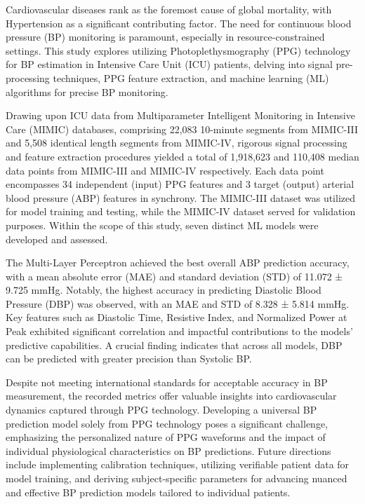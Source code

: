     Cardiovascular diseases rank as the foremost cause of global mortality, with Hypertension as a significant contributing factor.
    The need for continuous blood pressure (BP) monitoring is paramount, especially in resource-constrained settings.
    This study explores utilizing Photoplethysmography (PPG) technology for BP estimation in Intensive Care Unit (ICU) patients, delving into signal pre-processing techniques,
    PPG feature extraction, and machine learning (ML) algorithms for precise BP monitoring.

    \vspace{0.4cm}

    Drawing upon ICU data from Multiparameter Intelligent Monitoring in Intensive Care (MIMIC) databases, comprising 22,083 10-minute segments from MIMIC-III and 5,508 identical length segments from MIMIC-IV,
    rigorous signal processing and feature extraction procedures yielded a total of 1,918,623 and 110,408 median data points from MIMIC-III and MIMIC-IV respectively.
    Each data point encompasses 34 independent (input) PPG features and 3 target (output) arterial blood pressure (ABP) features in synchrony.
    The MIMIC-III dataset was utilized for model training and testing, while the MIMIC-IV dataset served for validation purposes.
    Within the scope of this study, seven distinct ML models were developed and assessed.

    \vspace{0.4cm}

    The Multi-Layer Perceptron achieved the best overall ABP prediction accuracy, with a mean absolute error (MAE) and standard deviation (STD) of 11.072 ± 9.725 mmHg.
    Notably, the highest accuracy in predicting Diastolic Blood Pressure (DBP) was observed, with an MAE and STD of 8.328 ± 5.814 mmHg.
    Key features such as Diastolic Time, Resistive Index, and Normalized Power at Peak exhibited significant correlation and impactful contributions to the models' predictive capabilities.
    A crucial finding indicates that across all models, DBP can be predicted with greater precision than Systolic BP\@.

    \vspace{0.4cm}

    Despite not meeting international standards for acceptable accuracy in BP measurement, the recorded metrics offer valuable insights into cardiovascular dynamics captured through PPG technology.
    Developing a universal BP prediction model solely from PPG technology poses a significant challenge, emphasizing the personalized nature of PPG waveforms
    and the impact of individual physiological characteristics on BP predictions.
    Future directions include implementing calibration techniques, utilizing verifiable patient data for model training, and deriving subject-specific parameters
    for advancing nuanced and effective BP prediction models tailored to individual patients.